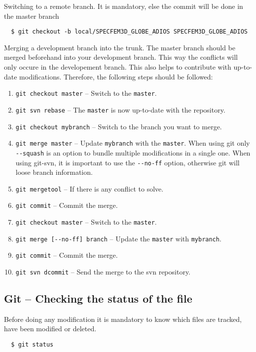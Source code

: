 \documentclass[11pt,twoside]{article}
\begin{document}
Switching to a remote branch. It is mandatory, else the commit will be done in the master branch
\begin{verbatim}
  $ git checkout -b local/SPECFEM3D_GLOBE_ADIOS SPECFEM3D_GLOBE_ADIOS
\end{verbatim}

Merging a development branch into the trunk. The master branch should be merged
beforehand into your development branch. This way the conflicts will only
occure in the developement branch. This also helps to contribute with
up-to-date modifications. Therefore, the following steps should be followed:
\begin{enumerate}
  \item \verb|git checkout master| -- Switch to the \texttt{master}.
  \item \verb|git svn rebase| -- The \texttt{master} is now up-to-date with the repository.
  \item \verb|git checkout mybranch| -- Switch to the branch you want to merge.
  \item \verb|git merge master| -- Update \texttt{mybranch} with the
\texttt{master}. When using git only \verb|--squash| is an option to bundle
multiple modifications in a single one. When using git-svn, it is important to
use the \verb|--no-ff| option, otherwise git will loose branch information.
  \item \verb|git mergetool| -- If there is any conflict to solve.
  \item \verb|git commit| -- Commit the merge.
  \item \verb|git checkout master| -- Switch to the \texttt{master}.
  \item \verb|git merge [--no-ff] branch| -- Update the \texttt{master} with \texttt{mybranch}.
  \item \verb|git commit| -- Commit the merge.
  \item \verb|git svn dcommit| -- Send the merge to the svn repository.
\end{enumerate}



\subsection*{Git -- Checking the status of the file}
Before doing any modification it is mandatory to know which files are tracked, have been modified or deleted.

\begin{verbatim}
  $ git status
\end{verbatim}
\end{document}
